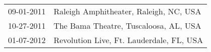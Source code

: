 \begin{supertabular}{ll}
 09-01-2011 &    Raleigh Amphitheater, Raleigh, NC, USA \\
 10-27-2011 &     The Bama Theatre, Tuscaloosa, AL, USA \\
 01-07-2012 &  Revolution Live, Ft. Lauderdale, FL, USA \\
\end{supertabular}

